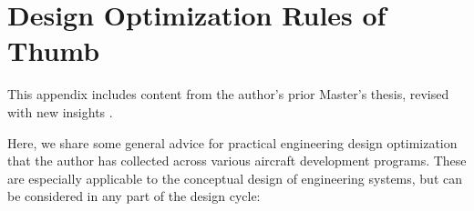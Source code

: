 \chapter{Design Optimization Rules of Thumb}
\label{appendix:rules-of-thumb}

\begin{attrib}
    This appendix includes content from the author's prior Master's thesis, revised with new insights \cite{sharpe_aerosandbox_2021}.
\end{attrib}

Here, we share some general advice for practical engineering design optimization that the author has collected across various aircraft development programs. These are especially applicable to the conceptual design of engineering systems, but can be considered in any part of the design cycle:

